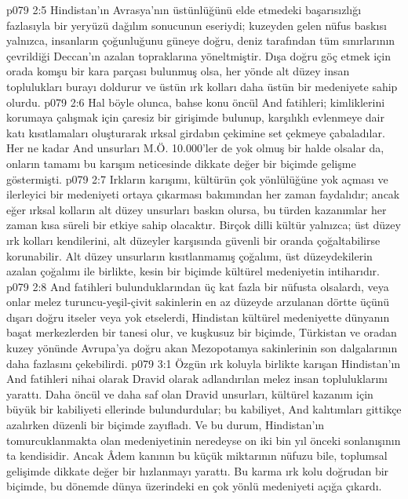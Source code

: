\vs p079 2:5 Hindistan’ın Avrasya’nın üstünlüğünü elde etmedeki başarısızlığı fazlasıyla bir yeryüzü dağılım sonucunun eseriydi; kuzeyden gelen nüfus baskısı yalnızca, insanların çoğunluğunu güneye doğru, deniz tarafından tüm sınırlarının çevrildiği Deccan’ın azalan topraklarına yöneltmiştir. Dışa doğru göç etmek için orada komşu bir kara parçası bulunmuş olsa, her yönde alt düzey insan toplulukları burayı doldurur ve üstün ırk kolları daha üstün bir medeniyete sahip olurdu.
\vs p079 2:6 Hal böyle olunca, bahse konu öncül And fatihleri; kimliklerini korumaya çalışmak için çaresiz bir girişimde bulunup, karşılıklı evlenmeye dair katı kısıtlamaları oluşturarak ırksal girdabın çekimine set çekmeye çabaladılar. Her ne kadar And unsurları M.Ö. 10.000’ler de yok olmuş bir halde olsalar da, onların tamamı bu karışım neticesinde dikkate değer bir biçimde gelişme göstermişti.
\vs p079 2:7 Irkların karışımı, kültürün çok yönlülüğüne yok açması ve ilerleyici bir medeniyeti ortaya çıkarması bakımından her zaman faydalıdır; ancak eğer ırksal kolların alt düzey unsurları baskın olursa, bu türden kazanımlar her zaman kısa süreli bir etkiye sahip olacaktır. Birçok dilli kültür yalnızca; üst düzey ırk kolları kendilerini, alt düzeyler karşısında güvenli bir oranda çoğaltabilirse korunabilir. Alt düzey unsurların kısıtlanmamış çoğalımı, üst düzeydekilerin azalan çoğalımı ile birlikte, kesin bir biçimde kültürel medeniyetin intiharıdır.
\vs p079 2:8 And fatihleri bulunduklarından üç kat fazla bir nüfusta olsalardı, veya onlar melez turuncu\hyp{}yeşil\hyp{}çivit sakinlerin en az düzeyde arzulanan dörtte üçünü dışarı doğru itseler veya yok etselerdi, Hindistan kültürel medeniyette dünyanın başat merkezlerden bir tanesi olur, ve kuşkusuz bir biçimde, Türkistan ve oradan kuzey yönünde Avrupa’ya doğru akan Mezopotamya sakinlerinin son dalgalarının daha fazlasını çekebilirdi.
\vs p079 3:1 Özgün ırk koluyla birlikte karışan Hindistan’ın And fatihleri nihai olarak Dravid olarak adlandırılan melez insan topluluklarını yarattı. Daha öncül ve daha saf olan Dravid unsurları, kültürel kazanım için büyük bir kabiliyeti ellerinde bulundurdular; bu kabiliyet, And kalıtımları gittikçe azalırken düzenli bir biçimde zayıfladı. Ve bu durum, Hindistan’ın tomurcuklanmakta olan medeniyetinin neredeyse on iki bin yıl önceki sonlanışının ta kendisidir. Ancak Âdem kanının bu küçük miktarının nüfuzu bile, toplumsal gelişimde dikkate değer bir hızlanmayı yarattı. Bu karma ırk kolu doğrudan bir biçimde, bu dönemde dünya üzerindeki en çok yönlü medeniyeti açığa çıkardı.

